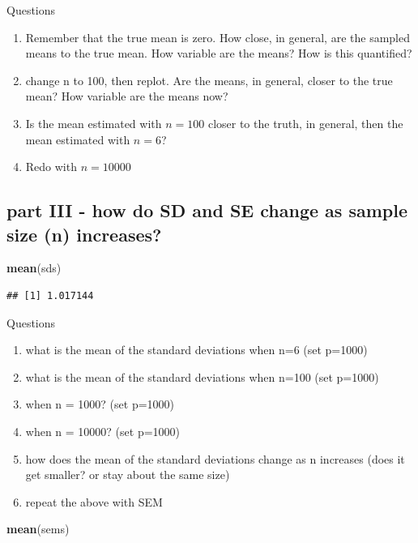 \documentclass[]{book}
\newenvironment{Shaded}{\begin{snugshade}}{\end{snugshade}}
\newcommand{\KeywordTok}[1]{\textcolor[rgb]{0.13,0.29,0.53}{\textbf{#1}}}
\newcommand{\NormalTok}[1]{#1}
\providecommand{\tightlist}{%
  \setlength{\itemsep}{0pt}\setlength{\parskip}{0pt}}
\begin{document}
Questions

\begin{enumerate}
\def\labelenumi{\arabic{enumi}.}
\tightlist
\item
  Remember that the true mean is zero. How close, in general, are the
  sampled means to the true mean. How variable are the means? How is
  this quantified?
\item
  change n to 100, then replot. Are the means, in general, closer to the
  true mean? How variable are the means now?
\item
  Is the mean estimated with \(n=100\) closer to the truth, in general,
  then the mean estimated with \(n=6\)?
\item
  Redo with \(n=10000\)
\end{enumerate}

\subsection{part III - how do SD and SE change as sample size (n)
increases?}\label{part-iii---how-do-sd-and-se-change-as-sample-size-n-increases}

\begin{Shaded}
\begin{Highlighting}[]
\KeywordTok{mean}\NormalTok{(sds)}
\end{Highlighting}
\end{Shaded}

\begin{verbatim}
## [1] 1.017144
\end{verbatim}

Questions

\begin{enumerate}
\def\labelenumi{\arabic{enumi}.}
\tightlist
\item
  what is the mean of the standard deviations when n=6 (set p=1000)
\item
  what is the mean of the standard deviations when n=100 (set p=1000)
\item
  when n = 1000? (set p=1000)
\item
  when n = 10000? (set p=1000)
\item
  how does the mean of the standard deviations change as n increases
  (does it get smaller? or stay about the same size)
\item
  repeat the above with SEM
\end{enumerate}

\begin{Shaded}
\begin{Highlighting}[]
\KeywordTok{mean}\NormalTok{(sems)}
\end{Highlighting}
\end{Shaded}
\end{document}
